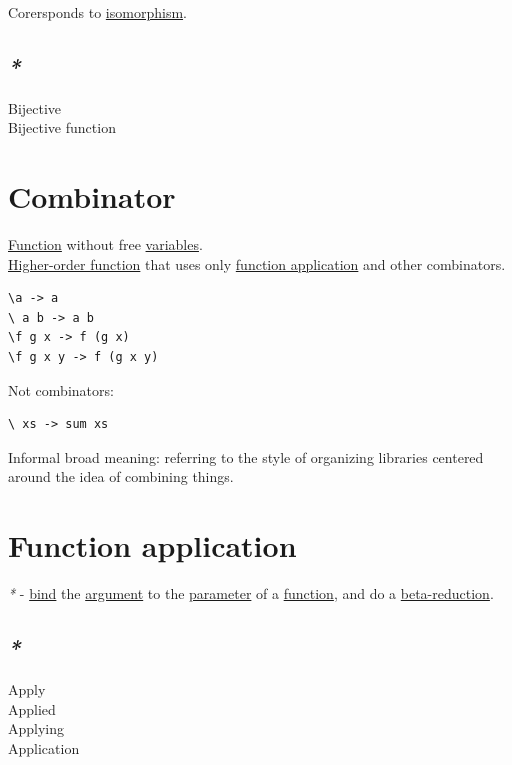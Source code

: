 \documentclass[a4paper,14pt,oneside]{book}
\begin{document}
Corersponds to \hyperref[org32ed122]{isomorphism}.\\

\subsection{\emph{*}}
\label{sec:orgcd7e5a9}

\label{org771d421}Bijective\\
\label{org6a1e67d}Bijective function\\

\section{\label{org020d205}Combinator}
\label{sec:org22ae431}
\hyperref[orge00b05b]{Function} without free \hyperref[org329012b]{variables}.\\
\hyperref[org9ab10e9]{Higher-order function} that uses only \hyperref[orgdcc7cf4]{function application} and other combinators.\\

\begin{verbatim}
\a -> a
\ a b -> a b
\f g x -> f (g x)
\f g x y -> f (g x y)
\end{verbatim}

Not combinators:\\
\begin{verbatim}
\ xs -> sum xs
\end{verbatim}
Informal broad meaning: referring to the style of organizing libraries centered around the idea of combining things.\\

\section{\label{orgdcc7cf4}Function application}
\label{sec:orgcb06b31}
\emph{*} - \hyperref[orgd3cebc1]{bind} the \hyperref[org9e788a4]{argument} to the \hyperref[org63b5bc7]{parameter} of a \hyperref[orge00b05b]{function}, and do a \hyperref[org42a1fe3]{beta-reduction}.\\

\subsection{\emph{*}}
\label{sec:org0739d63}

\label{org12c895c}Apply\\
\label{org8d2ef81}Applied\\
\label{org8ff03cd}Applying\\
\label{orgf09110d}Application\\
\end{document}
